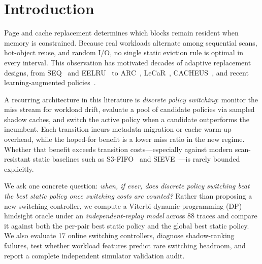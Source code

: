\documentclass[10pt,twocolumn]{article}
\begin{document}
\vspace{4pt}
\vspace{6pt}

\section{Introduction}
\label{sec:intro}

Page and cache replacement determines which blocks remain resident when memory is constrained. Because real workloads alternate among sequential scans, hot-object reuse, and random I/O, no single static eviction rule is optimal in every interval. This observation has motivated decades of adaptive replacement designs, from SEQ~\cite{seq} and EELRU~\cite{eelru} to ARC~\cite{arc}, LeCaR~\cite{lecar}, CACHEUS~\cite{cacheus}, and recent learning-augmented policies~\cite{lrb,l3cache,s4fifo}.

A recurring architecture in this literature is \emph{discrete policy switching}: monitor the miss stream for workload drift, evaluate a pool of candidate policies via sampled shadow caches, and switch the active policy when a candidate outperforms the incumbent. Each transition incurs metadata migration or cache warm-up overhead, while the hoped-for benefit is a lower miss ratio in the new regime. Whether that benefit exceeds transition costs---especially against modern scan-resistant static baselines such as S3-FIFO~\cite{s3fifo} and SIEVE~\cite{sieve}---is rarely bounded explicitly.

We ask one concrete question: \emph{when, if ever, does discrete policy switching beat the best static policy once switching costs are counted?} Rather than proposing a new switching controller, we compute a Viterbi dynamic-programming (DP) hindsight oracle under an \emph{independent-replay model} across 88 traces and compare it against both the per-pair best static policy and the global best static policy. We also evaluate 17 online switching controllers, diagnose shadow-ranking failures, test whether workload features predict rare switching headroom, and report a complete independent simulator validation audit.
\end{document}
